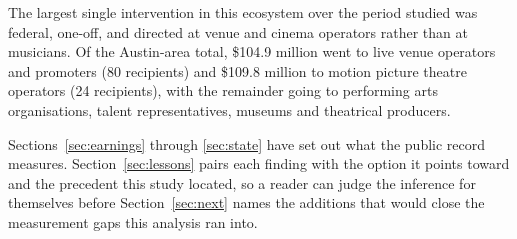 The largest single intervention in this ecosystem over the period studied
was federal, one-off, and directed at venue and cinema operators rather than
at musicians. Of the Austin-area total, \$104.9 million went to live venue
operators and promoters (80 recipients) and \$109.8 million to motion
picture theatre operators (24 recipients), with the remainder going to
performing arts organisations, talent representatives, museums and
theatrical producers.

Sections~\ref{sec:earnings} through \ref{sec:state} have set out what the
public record measures. Section~\ref{sec:lessons} pairs each finding with the
option it points toward and the precedent this study located, so a reader can
judge the inference for themselves before Section~\ref{sec:next} names the
additions that would close the measurement gaps this analysis ran into.
